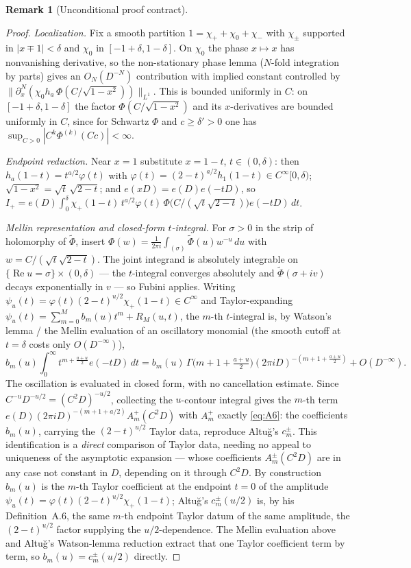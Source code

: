 \documentclass[11pt]{article}
\theoremstyle{definition}
\newtheorem{remark}[theorem]{Remark}
\newcommand{\wt}[1]{\widetilde{#1}}
\renewcommand{\Re}{\operatorname{Re}}
\begin{document}
\begin{remark}[Unconditional proof contract]
\begin{enumerate}
\begin{proof}
\emph{Localization.} Fix a smooth partition $1=\chi_++\chi_0+\chi_-$ with $\chi_\pm$ supported in
$|x\mp1|<\delta$ and $\chi_0$ in $[-1+\delta,1-\delta]$. On $\chi_0$ the phase $x\mapsto x$ has
nonvanishing derivative, so the non-stationary phase lemma \cite[Thm.~7.7.1]{Hormander} ($N$-fold
integration by parts) gives an $O_N(D^{-N})$ contribution with implied constant controlled by
$\|\partial_x^N(\chi_0 h_a\,\Phi(C/\sqrt{1-x^2}))\|_{L^1}$. This is bounded uniformly in $C$: on
$[-1+\delta,1-\delta]$ the factor $\Phi(C/\sqrt{1-x^2})$ and its $x$-derivatives are bounded uniformly
in $C$, since for Schwartz $\Phi$ and $c\ge\delta'>0$ one has $\sup_{C>0}|C^k\Phi^{(k)}(Cc)|<\infty$.

\emph{Endpoint reduction.} Near $x=1$ substitute $x=1-t$, $t\in(0,\delta)$: then
$h_a(1-t)=t^{a/2}\varphi(t)$ with $\varphi(t)=(2-t)^{a/2}h_1(1-t)\in C^\infty[0,\delta)$;
$\sqrt{1-x^2}=\sqrt t\,\sqrt{2-t}$; and $e(xD)=e(D)e(-tD)$, so
$I_+=e(D)\int_0^\delta \chi_+(1-t)\,t^{a/2}\varphi(t)\,\Phi\big(C/(\sqrt t\sqrt{2-t})\big)e(-tD)\,dt$.

\emph{Mellin representation and closed-form $t$-integral.} For $\sigma>0$ in the strip of holomorphy
of $\wt\Phi$, insert $\Phi(w)=\frac1{2\pi i}\int_{(\sigma)}\wt\Phi(u)w^{-u}\,du$ with
$w=C/(\sqrt t\sqrt{2-t})$. The joint integrand is absolutely integrable on
$\{\Re u=\sigma\}\times(0,\delta)$ --- the $t$-integral converges absolutely and $\wt\Phi(\sigma+iv)$
decays exponentially in $v$ --- so Fubini applies. Writing
$\psi_u(t)=\varphi(t)(2-t)^{u/2}\chi_+(1-t)\in C^\infty$ and Taylor-expanding
$\psi_u(t)=\sum_{m=0}^{M}b_m(u)t^m+R_M(u,t)$, the $m$-th $t$-integral is, by Watson's lemma / the
Mellin evaluation of an oscillatory monomial \cite[Ch.~3]{Wong} (the smooth cutoff at $t=\delta$ costs
only $O(D^{-\infty})$),
\[
  b_m(u)\!\int_0^\infty t^{m+\frac{a+u}{2}}e(-tD)\,dt
  = b_m(u)\,\Gamma\!\big(m{+}1{+}\tfrac{a+u}{2}\big)(2\pi iD)^{-(m+1+\frac{a+u}{2})}+O(D^{-\infty}).
\]
The oscillation is evaluated in closed form, with no cancellation estimate. Since
$C^{-u}D^{-u/2}=(C^2D)^{-u/2}$, collecting the $u$-contour integral gives the $m$-th term
$e(D)(2\pi iD)^{-(m+1+a/2)}A^+_m(C^2D)$ with $A^+_m$ exactly \eqref{eq:A6}: the coefficients $b_m(u)$,
carrying the $(2-t)^{u/2}$ Taylor data, reproduce Altu\u{g}'s $c^\pm_m$. This identification is a \emph{direct}
comparison of Taylor data, needing no appeal to uniqueness of the asymptotic expansion --- whose coefficients
$A^\pm_m(C^2D)$ are in any case not constant in $D$, depending on it through $C^2D$. By construction $b_m(u)$ is
the $m$-th Taylor coefficient at the endpoint $t=0$ of the amplitude $\psi_u(t)=\varphi(t)(2-t)^{u/2}\chi_+(1-t)$;
Altu\u{g}'s $c^\pm_m(u/2)$ is, by his Definition~A.6, the same $m$-th endpoint Taylor datum of the same amplitude,
the $(2-t)^{u/2}$ factor supplying the $u/2$-dependence. The Mellin evaluation above and Altu\u{g}'s Watson-lemma
reduction extract that one Taylor coefficient term by term, so $b_m(u)=c^\pm_m(u/2)$ directly.


\end{proof}
\end{enumerate}
\end{remark}
\end{document}
